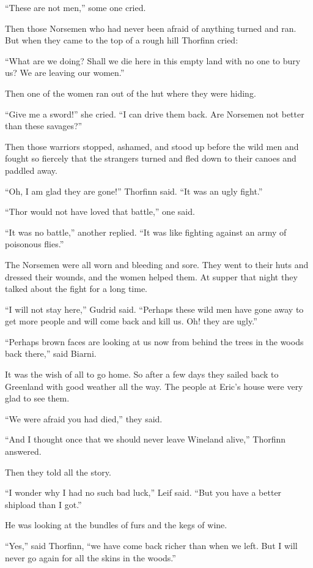 ``These are not men,'' some one cried.

Then those Norsemen who had never been afraid of anything turned and
ran. But when they came to the top of a rough hill Thorfinn cried:

``What are we doing? Shall we die here in this empty land with no one to
bury us? We are leaving our women.''

Then one of the women ran out of the hut where they were hiding.

``Give me a sword!'' she cried. ``I can drive them back. Are Norsemen
not better than these savages?''

Then those warriors stopped, ashamed, and stood up before the wild men
and fought so fiercely that the strangers turned and fled down to their
canoes and paddled away.

``Oh, I am glad they are gone!'' Thorfinn said. ``It was an ugly
fight.''

``Thor would not have loved that battle,'' one said.

``It was no battle,'' another replied. ``It was like fighting against an
army of poisonous flies.''

The Norsemen were all worn and bleeding and sore. They went to their
huts and dressed their wounds, and the women helped them. At supper that
night they talked about the fight for a long time.

``I will not stay here,'' Gudrid said. ``Perhaps these wild men have
gone away to get more people and will come back and kill us. Oh! they
are ugly.''

``Perhaps brown faces are looking at us now from behind the trees in the
woods back there,'' said Biarni.

It was the wish of all to go home. So after a few days they sailed back
to Greenland with good weather all the way. The people at Eric's house
were very glad to see them.

``We were afraid you had died,'' they said.

``And I thought once that we should never leave Wineland alive,''
Thorfinn answered.

Then they told all the story.

``I wonder why I had no such bad luck,'' Leif said. ``But you have a
better shipload than I got.''

He was looking at the bundles of furs and the kegs of wine.

``Yes,'' said Thorfinn, ``we have come back richer than when we left.
But I will never go again for all the skins in the woods.''

